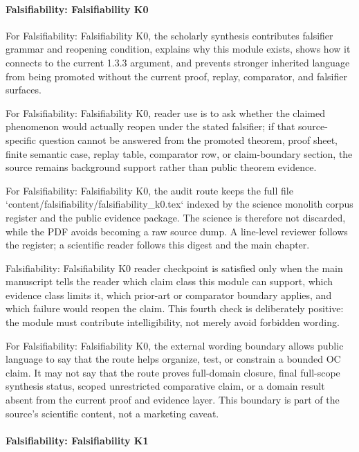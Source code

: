 \paragraph{Falsifiability: Falsifiability K0}

For Falsifiability: Falsifiability K0, the scholarly synthesis contributes falsifier grammar and reopening condition, explains why this module exists, shows how it connects to the current 1.3.3 argument, and prevents stronger inherited language from being promoted without the current proof, replay, comparator, and falsifier surfaces.


For Falsifiability: Falsifiability K0, reader use is to ask whether the claimed phenomenon would actually reopen under the stated falsifier; if that source-specific question cannot be answered from the promoted theorem, proof sheet, finite semantic case, replay table, comparator row, or claim-boundary section, the source remains background support rather than public theorem evidence.


For Falsifiability: Falsifiability K0, the audit route keeps the full file `content/falsifiability/falsifiability\_k0.tex` indexed by the science monolith corpus register and the public evidence package. The science is therefore not discarded, while the PDF avoids becoming a raw source dump. A line-level reviewer follows the register; a scientific reader follows this digest and the main chapter.


Falsifiability: Falsifiability K0 reader checkpoint is satisfied only when the main manuscript tells the reader which claim class this module can support, which evidence class limits it, which prior-art or comparator boundary applies, and which failure would reopen the claim. This fourth check is deliberately positive: the module must contribute intelligibility, not merely avoid forbidden wording.


For Falsifiability: Falsifiability K0, the external wording boundary allows public language to say that the route helps organize, test, or constrain a bounded OC claim. It may not say that the route proves full-domain closure, final full-scope synthesis status, scoped unrestricted comparative claim, or a domain result absent from the current proof and evidence layer. This boundary is part of the source's scientific content, not a marketing caveat.


\paragraph{Falsifiability: Falsifiability K1}

